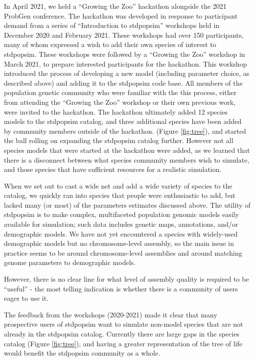 \documentclass[hidelinks]{article}
\begin{document}
In April 2021, we held a ``Growing the Zoo'' hackathon 
alongside the 2021 ProbGen conference. 
The hackathon was developed in response to participant demand from a
series of ``Introduction to stdpopsim'' workshops held in December 2020 and
February 2021. These workshops had over 150 participants, many of whom
expressed a wish to add their own species of interest to stdpopsim.
These workshops were followed by a ``Growing the Zoo'' workshop in
March 2021, to prepare interested participants for the hackathon. This
workshop introduced the process of developing a new model (including
parameter choice, as described above) and adding it to the stdpopsim
code base. All members of the population genetic community who were 
familiar with the this process, either from attending the
``Growing the Zoo'' workshop or their own previous work, were invited to
the hackathon. The hackathon ultimately added 12 species models to
the stdpopsim catalog, and three additional species have been added by
community members outside of the hackathon. (Figure \ref{fig:tree}),
and started the ball rolling on expanding the
stdpopsim catalog further. However not all species models that were started
at the hackathon were added, as we learned that there is a disconnect
between what species community members wish to simulate, and those
species that have sufficient resources for a realistic simulation.


When we set out to cast a wide net and add a wide variety of species to
the catalog, we quickly ran into species that people were enthusiastic
to add, but lacked many (or most) of the parameters estimates discussed above. The
utility of stdpopsim is to make complex, multifaceted population genomic models easily available for
simulation; such data includes genetic maps, annotations, and/or
demographic models. We have not yet encountered a species with
widely-used demographic models but no chromosome-level assembly, so the
main issue in practice seems to be around chromosome-level assemblies
and around matching genome parameters to demographic models.

However, there is no clear line for what level of assembly quality is
required to be ``useful'' - the most telling indication is whether there is
a community of users eager to use it.

The feedback from the workshops (2020-2021) made
it clear that many prospective users of stdpopsim want to simulate
non-model species that are not already in the stdpopsim catalog.
Currently there are large gaps in the species catalog (Figure \ref{fig:tree}), 
and having a greater representation of the tree of life would benefit 
the stdpopsim community as a whole.
\end{document}
